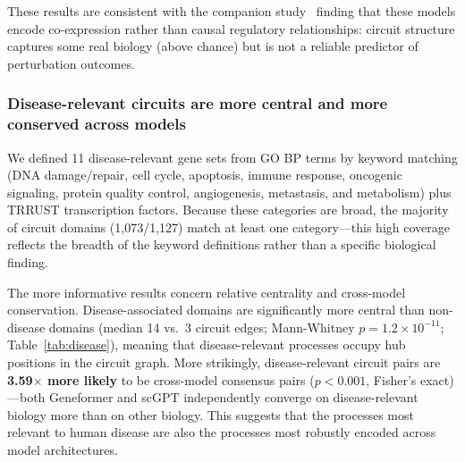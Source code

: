 \documentclass[onecolumn]{article}
\begin{document}
These results are consistent with the companion study~\citep{kendiukhov2025systematic} finding that these models encode co-expression rather than causal regulatory relationships: circuit structure captures some real biology (above chance) but is not a reliable predictor of perturbation outcomes.

\subsubsection{Disease-relevant circuits are more central and more conserved across models}

We defined 11 disease-relevant gene sets from GO BP terms by keyword matching (DNA damage/repair, cell cycle, apoptosis, immune response, oncogenic signaling, protein quality control, angiogenesis, metastasis, and metabolism) plus TRRUST transcription factors. Because these categories are broad, the majority of circuit domains (1,073/1,127) match at least one category---this high coverage reflects the breadth of the keyword definitions rather than a specific biological finding.

The more informative results concern relative centrality and cross-model conservation. Disease-associated domains are significantly more central than non-disease domains (median 14 vs.\ 3 circuit edges; Mann-Whitney $p = 1.2 \times 10^{-11}$; Table~\ref{tab:disease}), meaning that disease-relevant processes occupy hub positions in the circuit graph. More strikingly, disease-relevant circuit pairs are \textbf{3.59$\times$ more likely} to be cross-model consensus pairs ($p < 0.001$, Fisher's exact)---both Geneformer and scGPT independently converge on disease-relevant biology more than on other biology. This suggests that the processes most relevant to human disease are also the processes most robustly encoded across model architectures.
\end{document}

